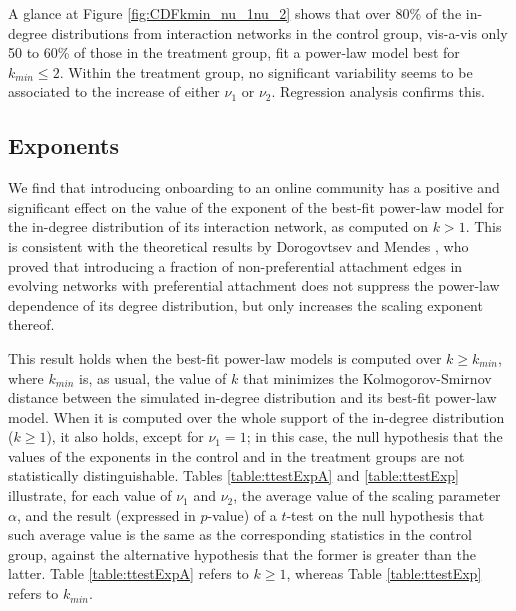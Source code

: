 \documentclass{bmcart}
\def\texttt{[image: ]}
\begin{document}
%

A glance at Figure \ref{fig:CDFkmin_nu_1nu_2} shows that over 80\% of the in-degree distributions from interaction networks in the control group, vis-a-vis only 50 to 60\% of those in the treatment group, fit a power-law model best for $k_{min} \leq 2$. Within the treatment group, no significant variability seems to be associated to the increase of either $\nu_1$ or $\nu_2$. Regression analysis confirms this.

\subsection{Exponents} \label{ssec:exponents}
We find that introducing onboarding to an online community has a positive and significant effect on the value of the exponent of the best-fit power-law model for the in-degree distribution of its interaction network, as computed on $k > 1$. This is consistent with the theoretical results by Dorogovtsev and Mendes \cite{dorogovtsev2002evolution}, who proved that introducing a fraction of non-preferential attachment edges in evolving networks with preferential attachment does not suppress the power-law dependence of its degree distribution, but only increases the scaling exponent thereof. 

This result holds when the best-fit power-law models is computed over $k \geq k_{min}$, where $k_{min}$ is, as usual, the value of $k$ that minimizes the Kolmogorov-Smirnov distance between the simulated in-degree distribution and its best-fit power-law model. When it is computed over the whole support of the in-degree distribution ($k \geq  1$), it also holds, except for $\nu_1 = 1$; in this case, the null hypothesis that the values of the exponents in the control and in the treatment groups are not statistically distinguishable. Tables \ref {table:ttestExpA} and \ref {table:ttestExp} illustrate, for each value of  $\nu_1$ and $\nu_2$, the average value of the scaling parameter $\alpha$, and the result (expressed in $p$-value) of a $t$-test on the null hypothesis that such average value is the same as the corresponding statistics in the control group, against the alternative hypothesis that the former is greater than the latter. Table \ref{table:ttestExpA} refers to $k \geq  1$, whereas Table \ref{table:ttestExp} refers to $k_{min}$.
\end{document}
